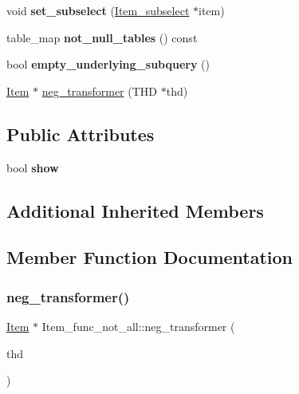 \begin{DoxyCompactItemize}
\mbox{\label{classItem__func__not__all_a56db8ec8ba2ab069f3690c194d1b9fbd}} 
void {\bfseries set\+\_\+subselect} (\mbox{\hyperlink{classItem__subselect}{Item\+\_\+subselect}} $\ast$item)
\item 
\mbox{\label{classItem__func__not__all_a30732055e76e4698a48ccb48845adb29}} 
table\+\_\+map {\bfseries not\+\_\+null\+\_\+tables} () const
\item 
\mbox{\label{classItem__func__not__all_a0ad44a4db3479c4f0cafe6e916dfe7e1}} 
bool {\bfseries empty\+\_\+underlying\+\_\+subquery} ()
\item 
\mbox{\hyperlink{classItem}{Item}} $\ast$ \mbox{\hyperlink{classItem__func__not__all_a5efa58fa1c7361846ec917da2e416c8d}{neg\+\_\+transformer}} (T\+HD $\ast$thd)
\end{DoxyCompactItemize}
\subsection*{Public Attributes}
\begin{DoxyCompactItemize}
\item 
\mbox{\label{classItem__func__not__all_a637f058f684d2967e78b9c10703147bd}} 
bool {\bfseries show}
\end{DoxyCompactItemize}
\subsection*{Additional Inherited Members}


\subsection{Member Function Documentation}
\mbox{\label{classItem__func__not__all_a5efa58fa1c7361846ec917da2e416c8d}} 
\subsubsection{\texorpdfstring{neg\+\_\+transformer()}{neg\_transformer()}}
{\footnotesize\ttfamily \mbox{\hyperlink{classItem}{Item}} $\ast$ Item\+\_\+func\+\_\+not\+\_\+all\+::neg\+\_\+transformer (\begin{DoxyParamCaption}\item[{T\+HD $\ast$}]{thd }\end{DoxyParamCaption})\hspace{0.3cm}{\ttfamily [virtual]}}

